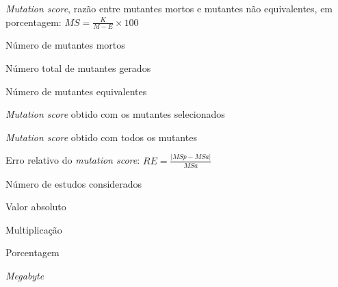 \begin{simbolos}
  \item[MS] \textit{Mutation score}, razão entre mutantes mortos e mutantes não equivalentes, em porcentagem: $MS = \frac{K}{M - E} \times 100$
  \item[K] Número de mutantes mortos
  \item[M] Número total de mutantes gerados
  \item[E] Número de mutantes equivalentes
  \item[MSp] \textit{Mutation score} obtido com os mutantes selecionados
  \item[MSa] \textit{Mutation score} obtido com todos os mutantes
  \item[RE] Erro relativo do \textit{mutation score}: $RE = \frac{|MSp - MSa|}{MSa}$
  \item[n] Número de estudos considerados
  \item[$|\,|$] Valor absoluto
  \item[$\times$] Multiplicação
  \item[\%] Porcentagem
  \item[MB] \textit{Megabyte}
\end{simbolos}